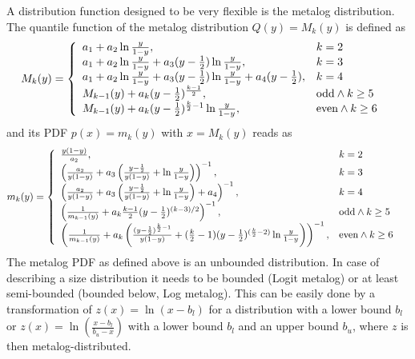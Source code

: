 A distribution function designed to be very flexible is the metalog distribution.
The quantile function of the metalog distribution $Q(y)=M_{k}(y)$ is defined as \cite{Keelin2011,Keelin2016,Keelin2019}
\begin{align}
 M_{k}(y) &=
 \left\{{\begin{array}{ll}
    a_{1}+a_{2}\ln {y \over {1-y}},&  k=2\\
    a_{1}+a_{2}\ln {y \over {1-y}} +a_{3}(y-\frac12)\ln {y \over {1-y}},& k=3 \\
    a_{1}+a_{2}\ln {y \over {1-y}} +a_{3}(y-\frac12)\ln {y \over {1-y}}+a_{4}(y-\frac12),& k=4 \\
    M_{k-1}(y)+a_{k}(y-\frac12)^{k-1 \over 2},&{\mbox{odd}}\wedge k\geq 5 \\
    M_{k-1}(y)+a_{k}(y-\frac12)^{{k \over 2}-1}\ln {y \over {1-y}}, &{\mbox{even}}\wedge k\geq 6 \\
 \end{array}}\right. \label{eq:Mk}
\end{align}
and its PDF $p(x)=m_k(y)$ with $x=M_{k}(y)$ reads as
\begin{align}
\label{eq:mk}
 m_{k}(y) &=
\left\{
  \begin{array}{ll}
    {y(1-y) \over {a_{2}}}, & k=2 \\
    \left({a_{2} \over {y(1-y)}}+a_{3}\left({y-\frac12 \over {y(1-y)}}+\ln {y \over {1-y}}\right)\right)^{-1}, & k=3\\
    \left({a_{2} \over {y(1-y)}}+a_{3}\left({y-\frac12 \over {y(1-y)}}+\ln {y \over {1-y}}\right)+a_{4}\right)^{-1}, &k=4\\
    \left({1 \over {m_{k-1}(y)}}+a_{k}{\frac{k-1}{2}}(y-\frac12)^{(k-3)/2}\right)^{-1}, & \mbox{odd} \wedge  k\geq 5\\
    \left({1 \over {m_{k-1}(y)}}+a_{k}\left({(y-\frac12)^{\frac{k}{2}-1} \over {y(1-y)}}+({k \over 2}-1)(y-\frac12)^{(\frac{k}{2}-2)}\ln {y \over {1-y}}\right)\right)^{-1}, &\mbox{even} \wedge  k\geq 6\\
 \end{array}
\right.
\end{align}
The metalog PDF as defined above is an unbounded distribution. In case of describing a size distribution it needs to be bounded (Logit metalog) or at least semi-bounded (bounded below, Log metalog). This can be easily done by a transformation of $z(x) = \ln \left(x-b_l\right)$ for a distribution with a lower bound $b_l$ or $z(x)=\ln\left(\frac{x-b_l}{b_u-x}\right)$ with a lower bound $b_l$ and an upper bound $b_u$, where $z$ is then metalog-distributed.
